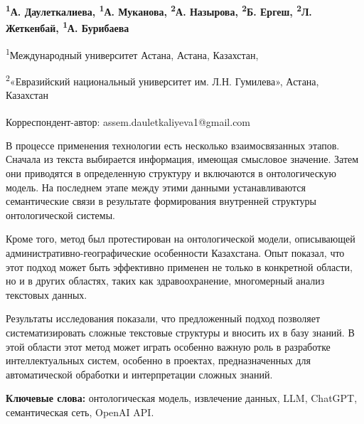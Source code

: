 
\begin{articleheader}

{\bfseries
\textsuperscript{1}А. Даулеткалиева\textsuperscript{\envelope },
\textsuperscript{1}А. Муканова,
\textsuperscript{2}А. Назырова,
\textsuperscript{2}Б. Ергеш,
\textsuperscript{2}Л. Жеткенбай,
\textsuperscript{1}А. Бурибаева
}
\end{articleheader}

\begin{affiliation}
\textsuperscript{1}Международный университет Астана, Астана, Казахстан,

\textsuperscript{2}«Евразийский национальный университет им. Л.Н. Гумилева», Астана, Казахстан

\raggedright \textsuperscript{\envelope }Корреспондент-автор: assem.dauletkaliyeva1@gmail.com
\end{affiliation}

В процессе применения технологии есть несколько взаимосвязанных этапов.
Сначала из текста выбирается информация, имеющая смысловое значение.
Затем они приводятся в определенную структуру и включаются в
онтологическую модель. На последнем этапе между этими данными
устанавливаются семантические связи в результате формирования внутренней
структуры онтологической системы.

Кроме того, метод был протестирован на онтологической модели,
описывающей административно-географические особенности Казахстана. Опыт
показал, что этот подход может быть эффективно применен не только в
конкретной области, но и в других областях, таких как здравоохранение,
многомерный анализ текстовых данных.

Результаты исследования показали, что предложенный подход позволяет
систематизировать сложные текстовые структуры и вносить их в базу
знаний. В этой области этот метод может играть особенно важную роль в
разработке интеллектуальных систем, особенно в проектах, предназначенных
для автоматической обработки и интерпретации сложных знаний.

{\bfseries Ключевые слова:} онтологическая модель, извлечение данных, LLM,
ChatGPT, семантическая сеть, OpenAI API.

